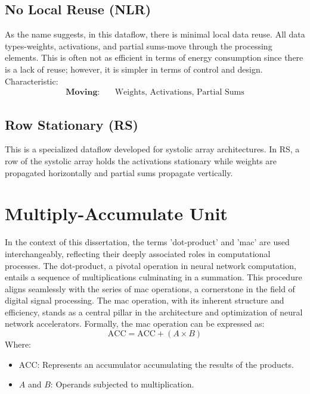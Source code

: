 \subsection*{No Local Reuse (NLR)}
As the name suggests, in this dataflow, there is minimal local data reuse. All data types-weights, activations, and partial sums-move through the processing elements. This is often not as efficient in terms of energy consumption since there is a lack of reuse; however, it is simpler in terms of control and design. Characteristic:
\begin{align*}
\textbf{Moving:} & \quad \text{Weights, Activations, Partial Sums}
\end{align*}

\subsection*{Row Stationary (RS)}
This is a specialized dataflow developed for systolic array architectures. In RS, a row of the systolic array holds the activations stationary while weights are propagated horizontally and partial sums propagate vertically.


\section{Multiply-Accumulate Unit}

In the context of this dissertation, the terms 'dot-product' and '\gls{mac}' are used interchangeably, reflecting their deeply associated roles in computational processes. The dot-product, a pivotal operation in neural network computation, entails a sequence of multiplications culminating in a summation. This procedure aligns seamlessly with the series of \gls{mac} operations, a cornerstone in the field of digital signal processing. The \gls{mac} operation, with its inherent structure and efficiency, stands as a central pillar in the architecture and optimization of neural network accelerators. Formally, the \gls{mac} operation can be expressed as:
\begin{equation}
\text{ACC} = \text{ACC} + (A \times B)
\end{equation}
Where:
\begin{itemize}
	\item \( \text{ACC} \): Represents an accumulator accumulating the results of the products.
	\item \( A \) and \( B \): Operands subjected to multiplication.
\end{itemize}

